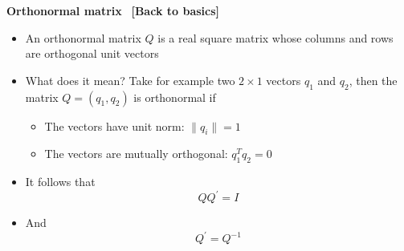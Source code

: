 \documentclass[10pt,english,t,aspectratio=169,ignorenonframetext]{beamer}
\begin{document}
\begin{frame}
{\color{note} \textbf{Orthonormal matrix} \ {\footnotesize \textbf{[Back to
basics]}}}\bigskip

\begin{itemize}
\item An orthonormal matrix $Q$ is a real square matrix whose columns and
rows are orthogonal unit vectors\bigskip

\item What does it mean? Take for example two $2\times 1$ vectors $q_{1}$
and $q_{2}$, then the matrix $Q=(q_{1},q_{2})$ is orthonormal if\smallskip

\begin{itemize}
\item The vectors have unit norm: $\parallel q_{i}\parallel =1$\medskip

\item The vectors are mutually orthogonal: $q_{1}^{T}q_{2}=0$\bigskip
\end{itemize}

\item It follows that 
\begin{equation*}
QQ^{\prime }=I
\end{equation*}

\item And%
\begin{equation*}
Q^{\prime }=Q^{-1}
\end{equation*}
\end{itemize}
\end{frame}

\end{document}
